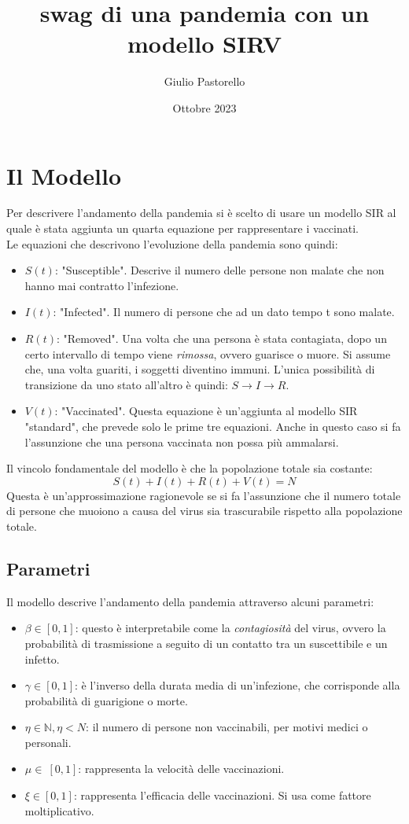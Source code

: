 \documentclass{article}
\title{swag di una pandemia con un modello SIRV}
\author{Giulio Pastorello }
\date{Ottobre 2023}
\begin{document}
\maketitle

\section{Il Modello}

\hspace{\parindent} Per descrivere l'andamento della pandemia si è scelto 
di usare un modello SIR al quale è stata aggiunta un quarta 
equazione per rappresentare i vaccinati.\\
Le equazioni che descrivono l'evoluzione della pandemia sono quindi:
\begin{itemize}
\item $S(t)$: "Susceptible". Descrive il numero delle persone non 
malate che non hanno mai contratto l'infezione.
\item $I(t)$: "Infected". Il numero di persone che ad un dato tempo 
t sono malate. 
\item $R(t)$: "Removed". Una volta che una persona è stata 
contagiata, dopo un certo intervallo di tempo viene \textit{rimossa}, 
ovvero guarisce o muore. Si assume che, una volta guariti, 
i soggetti diventino immuni. L'unica possibilità di transizione da 
uno stato all'altro è quindi: $S\xrightarrow{}I\xrightarrow{}R$.
\item $V(t)$: "Vaccinated". Questa equazione è un'aggiunta al modello 
SIR "standard", che prevede solo le prime tre equazioni. 
Anche in questo caso si fa l'assunzione che una persona vaccinata 
non possa più ammalarsi.
\end{itemize}
Il vincolo fondamentale del modello è che la popolazione totale 
sia costante:
\begin{equation}\label{eq::pop}
S(t)+I(t)+R(t)+V(t)=N
\end{equation}
Questa è un'approssimazione ragionevole se si fa l'assunzione 
che il numero totale di persone che muoiono a causa del virus 
sia trascurabile rispetto alla popolazione totale.
\subsection{Parametri}
Il modello descrive l'andamento della pandemia attraverso alcuni 
parametri:
\begin{itemize} 
\item $\beta \in [0,1]$: questo è interpretabile come la 
\textit{contagiosità} del virus, ovvero la probabilità di 
trasmissione a seguito di un contatto tra un suscettibile e un infetto.
\item $\gamma \in [0,1]$: è l'inverso della durata media di 
un'infezione, che corrisponde alla probabilità di guarigione o morte.
\item $\eta \in \mathbb{N}, \eta < N$: il numero di persone non 
vaccinabili, per motivi medici o personali.
\item $\mu \in\ [0,1]$: rappresenta la velocità delle vaccinazioni.
\item $\xi \in [0,1]$: rappresenta l'efficacia delle vaccinazioni. 
Si usa come fattore moltiplicativo.
\end{itemize}
\end{document}
